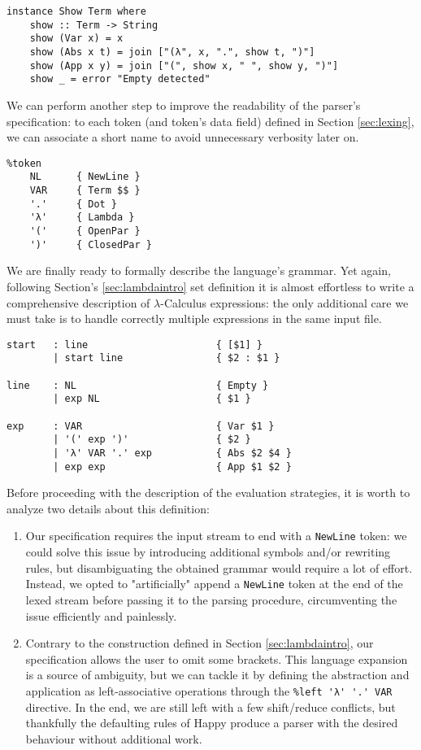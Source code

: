 \documentclass{article}
\begin{document}
\begin{lstlisting}
instance Show Term where
    show :: Term -> String
    show (Var x) = x
    show (Abs x t) = join ["(λ", x, ".", show t, ")"]
    show (App x y) = join ["(", show x, " ", show y, ")"]
    show _ = error "Empty detected"
\end{lstlisting}

We can perform another step to improve the readability of the parser's specification: to each token (and token's data field) defined in Section \ref{sec:lexing}, we can associate a short name to avoid unnecessary verbosity later on.

\begin{lstlisting}
%token
    NL      { NewLine }
    VAR     { Term $$ }
    '.'     { Dot }
    'λ'     { Lambda }
    '('     { OpenPar }
    ')'     { ClosedPar }
\end{lstlisting}

We are finally ready to formally describe the language's grammar. Yet again, following Section's \ref{sec:lambdaintro} set definition it is almost effortless to write a comprehensive description of $\lambda$-Calculus expressions: the only additional care we must take is to handle correctly multiple expressions in the same input file.

\begin{lstlisting}
start   : line                      { [$1] }
        | start line                { $2 : $1 }

line    : NL                        { Empty }
        | exp NL                    { $1 }

exp     : VAR                       { Var $1 }
        | '(' exp ')'               { $2 }
        | 'λ' VAR '.' exp           { Abs $2 $4 }
        | exp exp                   { App $1 $2 }
\end{lstlisting}

Before proceeding with the description of the evaluation strategies, it is worth to analyze two details about this definition:

\begin{enumerate}
    \item Our specification requires the input stream to end with a \lstinline|NewLine| token: we could solve this issue by introducing additional symbols and/or rewriting rules, but disambiguating the obtained grammar would require a lot of effort. Instead, we opted to "artificially" append a \lstinline|NewLine| token at the end of the lexed stream before passing it to the parsing procedure, circumventing the issue efficiently and painlessly.
    \item Contrary to the construction defined in Section \ref{sec:lambdaintro}, our specification allows the user to omit some brackets. This language expansion is a source of ambiguity, but we can tackle it by defining the abstraction and application as left-associative operations through the \lstinline|%left 'λ' '.' VAR| directive. In the end, we are still left with a few shift/reduce conflicts, but thankfully the defaulting rules of Happy produce a parser with the desired behaviour without additional work.
\end{enumerate}
\end{document}
